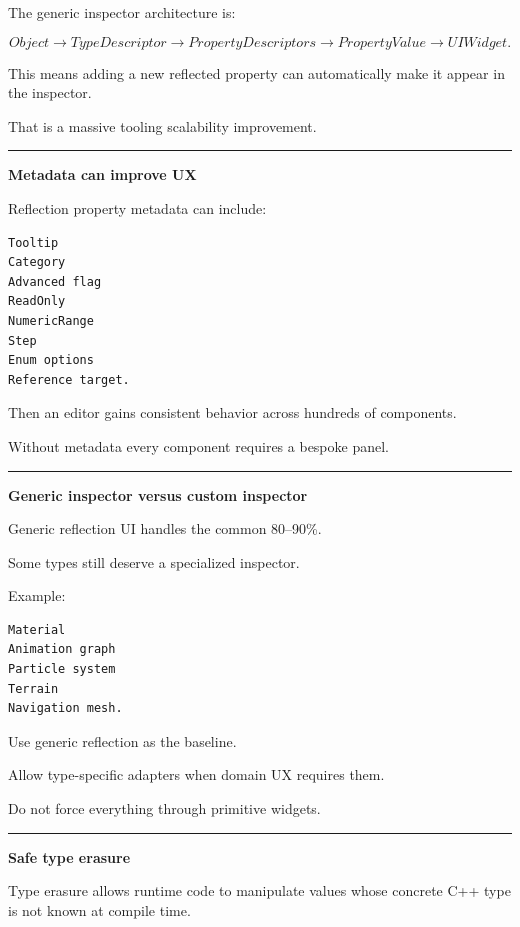 The generic inspector architecture is:

\[
Object
\rightarrow
TypeDescriptor
\rightarrow
PropertyDescriptors
\rightarrow
PropertyValue
\rightarrow
UIWidget.
\]

This means adding a new reflected property can automatically make it appear in the inspector.

That is a massive tooling scalability improvement.

\begin{center}\rule{0.5\linewidth}{0.5pt}\end{center}

\textbf{Metadata can improve UX}

Reflection property metadata can include:

\begin{verbatim}
Tooltip
Category
Advanced flag
ReadOnly
NumericRange
Step
Enum options
Reference target.
\end{verbatim}

Then an editor gains consistent behavior across hundreds of components.

Without metadata every component requires a bespoke panel.

\begin{center}\rule{0.5\linewidth}{0.5pt}\end{center}

\textbf{Generic inspector versus custom inspector}

Generic reflection UI handles the common 80--90\%.

Some types still deserve a specialized inspector.

Example:

\begin{verbatim}
Material
Animation graph
Particle system
Terrain
Navigation mesh.
\end{verbatim}

Use generic reflection as the baseline.

Allow type-specific adapters when domain UX requires them.

Do not force everything through primitive widgets.

\begin{center}\rule{0.5\linewidth}{0.5pt}\end{center}

\textbf{Safe type erasure}

Type erasure allows runtime code to manipulate values whose concrete C++ type is not known at compile time.

